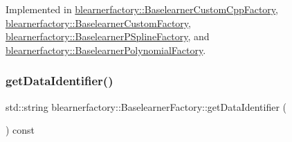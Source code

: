 Implemented in \mbox{\hyperlink{classblearnerfactory_1_1_baselearner_custom_cpp_factory_af11e8ca40f235632dba38ed3849f7606}{blearnerfactory\+::\+Baselearner\+Custom\+Cpp\+Factory}}, \mbox{\hyperlink{classblearnerfactory_1_1_baselearner_custom_factory_ae61c7af49c08d61b7714561bde1824d8}{blearnerfactory\+::\+Baselearner\+Custom\+Factory}}, \mbox{\hyperlink{classblearnerfactory_1_1_baselearner_p_spline_factory_a542e3f962314ea7fe46cfe8eed4c4da7}{blearnerfactory\+::\+Baselearner\+P\+Spline\+Factory}}, and \mbox{\hyperlink{classblearnerfactory_1_1_baselearner_polynomial_factory_af6d997c89f2e81a490352f23dee1ef9d}{blearnerfactory\+::\+Baselearner\+Polynomial\+Factory}}.

\mbox{\label{classblearnerfactory_1_1_baselearner_factory_a40703963bb3fd273b835a99263d9b599}} 
\subsubsection{\texorpdfstring{get\+Data\+Identifier()}{getDataIdentifier()}}
{\footnotesize\ttfamily std\+::string blearnerfactory\+::\+Baselearner\+Factory\+::get\+Data\+Identifier (\begin{DoxyParamCaption}{ }\end{DoxyParamCaption}) const}

